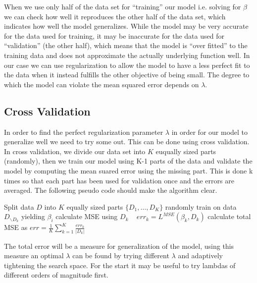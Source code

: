 \documentclass[12pt]{article}
\begin{document}
When we use only half of the data set for \enquote{training} our model i.e. solving for $\beta$ we can check how well it reproduces the other half of the data set, which indicates how well the model generalizes.
While the model may be very accurate for the data used for training, it may be inaccurate for the data used for \enquote{validation} (the other half), which means that the model is \enquote{over fitted} to the training data and does not approximate the actually underlying function well.
In our case we can use regularization to allow the model to have a less perfect fit to the data when it instead fulfills the other objective of being small.
The degree to which the model can violate the mean squared error depends on $\lambda$.

\subsection{Cross Validation}
In order to find the perfect regularization parameter $\lambda$ in order for our model to generalize well we need to try some out.
This can be done using cross validation.
In cross validation, we divide our data set into $K$ euqually sized parts (randomly), then we train our model using K-1 parts of the data and validate the model by computing the mean suared error using the missing part.
This is done k times so that each part has been used for validation once and the errors are averaged.
The following pseudo code should make the algorithm clear.
\begin{algorithmic}[1]
\State Split data $D$ into $K$ equally sized parts $\{D_1,\dots,D_K\}$ randomly
\State train on data $D_{\backslash D_k}$ yielding $\beta_i$
\State calculate MSE using $D_k$ ~ $err_k = L^{MSE}(\beta_k,D_k)$
\EndFor
\State calculate total MSE as $err=\frac{1}{K}\sum_{k=1}^K \frac{err_k}{|D_k|}$ 
\end{algorithmic}
The total error will be a measure for generalization of the model, using this measure an optimal $\lambda$ can be found by trying different $\lambda$ and adaptively tightening the search space.
For the start it may be useful to try lambdas of different orders of magnitude first.
\end{document}
